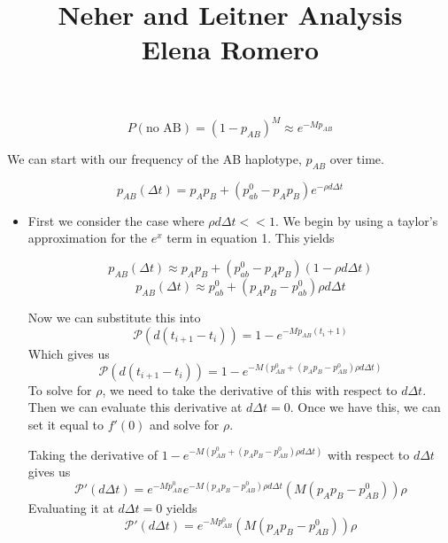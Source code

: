 \documentclass[12pt]{article}
\begin{document}
\title{\large \sc Neher and Leitner Analysis
\\ Elena Romero}
\maketitle
\vskip-10pt

\[P(\text{no AB}) = (1-p_{AB})^M \approx e^{-Mp_{AB}}\]

We can start with our frequency of the AB haplotype, $p_{AB}$ over time.

\begin{equation}
p_{AB}(\Delta t) = p_A p_B + (p_{ab}^0 - p_Ap_B)e^{- \rho d \Delta t}
\end{equation}

\begin{itemize}
\item First we consider the case where $\rho d \Delta t << 1$. We begin by using a taylor's approximation for the $e^x$ term in equation 1. This yields

\[p_{AB}(\Delta t)  \approx p_A p_B + (p_{ab}^0 - p_Ap_B)(1 - \rho d \Delta t)\]
\[p_{AB}(\Delta t)  \approx p_{ab}^0 + (p_Ap_B - p_{ab}^0) \rho d \Delta t\]

Now we can substitute this into 
\[\mathcal{P}(d(t_{i+1}-t_i)) = 1 - e^{-Mp_{AB}{(t_i + 1)}}\]
Which gives us 
\[\mathcal{P}(d(t_{i+1}-t_i)) = 1 - e^{- M(p_{AB}^0 + (p_Ap_B - p_{AB}^0)\rho d \Delta t)}\]
To solve for $\rho$, we need to take the derivative of this with respect to $d \Delta t$. Then we can evaluate this derivative at $d \Delta t = 0$. Once we have this, we can set it equal to $f'(0)$ and solve for $\rho$.

Taking the derivative of $1 - e^{- M(p_{AB}^0 + (p_Ap_B - p_{AB}^0)\rho d \Delta t)}$ with respect to $d\Delta t$ gives us
\[\mathcal{P}'(d \Delta t) = e^{-Mp_{AB}^0}e^{-M(p_Ap_B - p_{AB}^0)\rho d \Delta t}(M(p_Ap_B - p_{AB}^0))\rho\]
Evaluating it at $d \Delta t = 0$ yields
\begin{equation}\mathcal{P}'(d \Delta t) = e^{-Mp_{AB}^0}(M(p_Ap_B - p_{AB}^0))\rho\end{equation}


\end{itemize}
\end{document}
